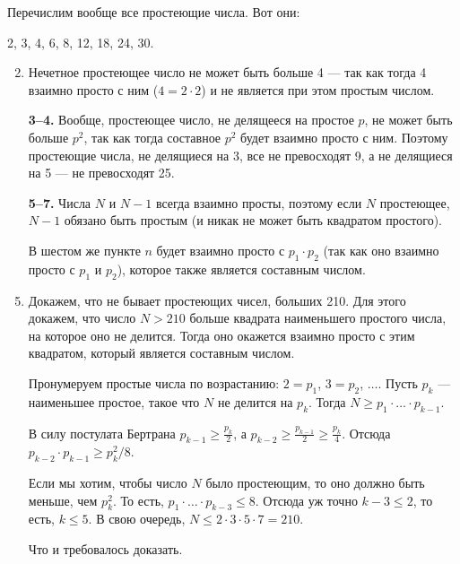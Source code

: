 ﻿
\def\lne{\medskip \\ \rule{0.65\textwidth}{0.028cm}}


\noindent Перечислим вообще все простеющие числа. Вот они:

\begin{center}
	2, 3, 4, 6, 8, 12, 18, 24, 30.
\end{center}

\begin{enumerate} \setcounter{enumi}{1}
	\item Нечетное простеющее число не может быть больше 4 — так как тогда 4 взаимно просто с ним ($4 = 2 \cdot 2$) и не является при этом простым числом.
	\item[\bfseries 3–4.] \setcounter{enumi}{4} Вообще, простеющее число, не делящееся на простое $p$, не может быть больше $p^2$, так как тогда составное $p^2$ будет взаимно просто с ним. Поэтому простеющие числа, не делящиеся на 3, все не превосходят 9, а не делящиеся на 5 — не превосходят 25.
	\item[\bfseries 5–7.] \setcounter{enumi}{7} Числа $N$ и $N-1$ всегда взаимно просты, поэтому если $N$ простеющее, $N-1$ обязано быть простым (и никак не может быть квадратом простого).

	В шестом же пункте $n$ будет взаимно просто с $p_1 \cdot p_2$ (так как оно взаимно просто с $p_1$ и $p_2$), которое также является составным числом.
	
	\item Докажем, что не бывает простеющих чисел, больших 210. Для этого докажем, что число $N >210$ больше квадрата наименьшего простого числа, на которое оно не делится. Тогда оно окажется взаимно просто с этим квадратом, который является составным числом.
	
	Пронумеруем простые числа по возрастанию: $2 = p_1$, $3 = p_2$, $\ldots$. Пусть $p_k$ — наименьшее простое, такое что $N$ не делится на $p_k$. Тогда $N \geq p_1 \cdot \ldots \cdot p_{k-1}$.
	
	В силу постулата Бертрана $p_{k-1} \ge \tfrac{p_k}{2}$, а $p_{k-2} \ge \tfrac{p_{k-1}}{2} \ge \tfrac{p_k}{4}$. Отсюда $p_{k-2} \cdot p_{k-1} \ge p_k^2 / 8$.
	
	Если мы хотим, чтобы число $N$ было простеющим, то оно должно быть меньше, чем $p_k^2$. То есть, $p_1 \cdot \ldots \cdot p_{k-3} \le 8$. Отсюда уж точно $k-3 \le 2$, то есть, $k \le 5$. В свою очередь, $N \le 2 \cdot 3 \cdot 5 \cdot 7 = 210$.

	Что и требовалось доказать.
\end{enumerate}